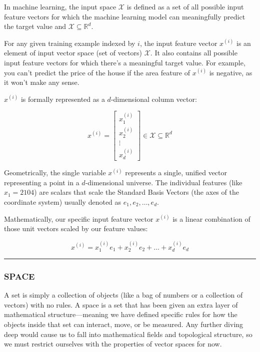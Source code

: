 \documentclass{article}
\begin{document}
In machine learning, the input space $\mathcal{X}$ is defined as a set of all possible input feature vectors for which the machine learning model can meaningfully predict the target value and $\mathcal{X} \subseteq \mathbb{R}^d$.

For any given training example indexed by $i$, the input feature vector $x^{(i)}$ is an element of input vector space (set of vectors) $\mathcal{X}$. It also contains all possible input feature vectors for which there's a meaningful target value. For example, you can't predict the price of the house if the area feature of $x^{(i)}$ is negative, as it won't make any sense.

$x^{(i)}$ is formally represented as a $d$-dimensional column vector:

\[ x^{(i)} = \begin{bmatrix} x_1^{(i)} \\ x_2^{(i)} \\ \vdots \\ x_d^{(i)} \end{bmatrix} \in \mathcal{X} \subseteq \mathbb{R}^d \]

Geometrically, the single variable $x^{(i)}$ represents a single, unified vector representing a point in a $d$-dimensional universe. The individual features (like $x_1 = 2104$) are scalars that scale the Standard Basis Vectors (the axes of the coordinate system) usually denoted as $e_1, e_2, \dots, e_d$.

Mathematically, our specific input feature vector $x^{(i)}$ is a linear combination of those unit vectors scaled by our feature values:

\[ x^{(i)} = x_1^{(i)} e_1 + x_2^{(i)} e_2 + \dots + x_d^{(i)} e_d \]

\vspace{1em}
\noindent\rule{\textwidth}{0.4pt}
\vspace{1em}

\subsubsection*{SPACE}

A set is simply a collection of objects (like a bag of numbers or a collection of vectors) with no rules. A space is a set that has been given an extra layer of mathematical structure—meaning we have defined specific rules for how the objects inside that set can interact, move, or be measured. Any further diving deep would cause us to fall into mathematical fields and topological structure, so we must restrict ourselves with the properties of vector spaces for now.
\end{document}
